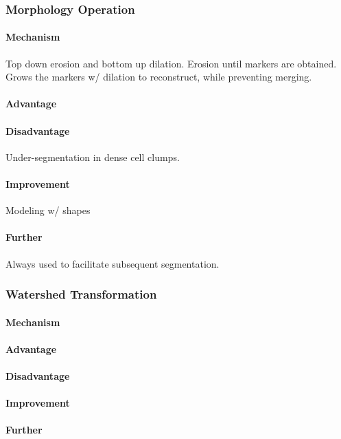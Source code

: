 \documentclass[10pt,a4paper]{article}
\begin{document}
\subsubsection{Morphology Operation}
\paragraph{Mechanism}
Top down erosion and bottom up dilation. Erosion until markers are obtained. Grows the markers w/ dilation to reconstruct, while preventing merging.
\paragraph{Advantage}
\paragraph{Disadvantage}
Under-segmentation in dense cell clumps.
\paragraph{Improvement}
Modeling w/ shapes
\paragraph{Further}
Always used to facilitate subsequent segmentation.

\subsubsection{Watershed Transformation}
\paragraph{Mechanism}
\paragraph{Advantage}
\paragraph{Disadvantage}
\paragraph{Improvement}
\paragraph{Further}

\newpage



\end{document}
